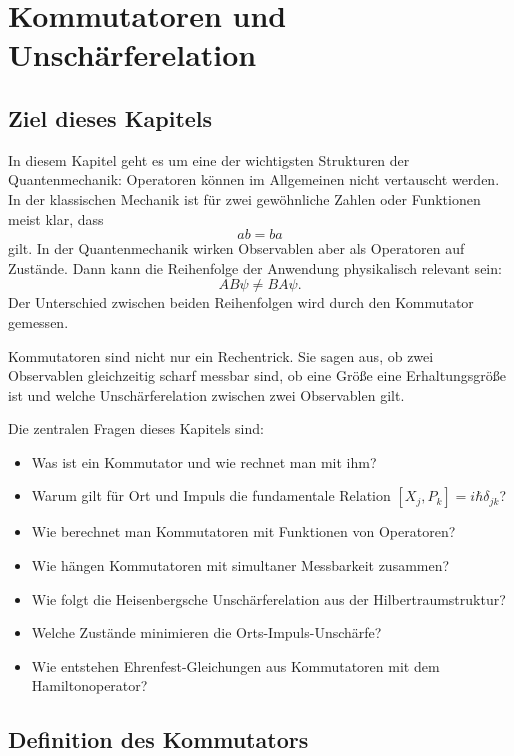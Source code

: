 \chapter{Kommutatoren und Unschärferelation}

\section{Ziel dieses Kapitels}

In diesem Kapitel geht es um eine der wichtigsten Strukturen der Quantenmechanik: Operatoren können im Allgemeinen nicht vertauscht werden. In der klassischen Mechanik ist für zwei gewöhnliche Zahlen oder Funktionen meist klar, dass
\[
    ab=ba
\]
gilt. In der Quantenmechanik wirken Observablen aber als Operatoren auf Zustände. Dann kann die Reihenfolge der Anwendung physikalisch relevant sein:
\[
    AB\psi \neq BA\psi.
\]
Der Unterschied zwischen beiden Reihenfolgen wird durch den Kommutator gemessen.

\begin{conceptbox}
Kommutatoren sind nicht nur ein Rechentrick. Sie sagen aus, ob zwei Observablen gleichzeitig scharf messbar sind, ob eine Größe eine Erhaltungsgröße ist und welche Unschärferelation zwischen zwei Observablen gilt.
\end{conceptbox}

Die zentralen Fragen dieses Kapitels sind:
\begin{itemize}
    \item Was ist ein Kommutator und wie rechnet man mit ihm?
    \item Warum gilt für Ort und Impuls die fundamentale Relation $[X_j,P_k]=i\hbar\delta_{jk}$?
    \item Wie berechnet man Kommutatoren mit Funktionen von Operatoren?
    \item Wie hängen Kommutatoren mit simultaner Messbarkeit zusammen?
    \item Wie folgt die Heisenbergsche Unschärferelation aus der Hilbertraumstruktur?
    \item Welche Zustände minimieren die Orts-Impuls-Unschärfe?
    \item Wie entstehen Ehrenfest-Gleichungen aus Kommutatoren mit dem Hamiltonoperator?
\end{itemize}

\section{Definition des Kommutators}

